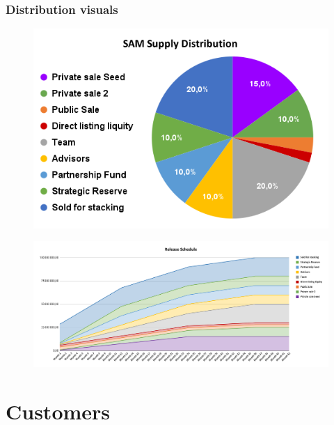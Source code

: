 ﻿\documentclass[a4paper]{article}
\begin{document}
\subsubsection{Distribution visuals}
 
\begin{figure}[!h]
\centering
\includegraphics[scale=0.5]{SAM_Supply_Distribution.png}
\end{figure}

\begin{figure}[!h]
\centering
\includegraphics[scale=0.3]{Release_schedule.png}
\end{figure}

\newpage
\section{Customers}
\end{document}
